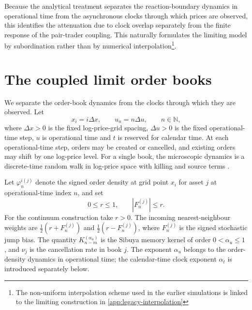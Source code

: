 \documentclass[5p,final]{elsarticle}
\begin{document}
Because the analytical treatment separates the reaction-boundary dynamics in operational time from the asynchronous clocks through which prices are observed, this identifies the attenuation due to clock overlap separately from the finite response of the pair-trader coupling. This naturally formulates the limiting model by subordination rather than by numerical interpolation\footnote{The non-uniform interpolation scheme used in the earlier simulations \citep{BauerDianaGebbie2024} is linked to the limiting construction in \ref{app:legacy-interpolation}}.

\section{The coupled limit order books} \label{sec:2}

We separate the order-book dynamics from the clocks through which they are observed. Let
\begin{equation}
    x_i=i\Delta x,
    \qquad
    u_n=n\Delta u,
    \qquad n\in\mathbb N,
\end{equation}
where $\Delta x>0$ is the fixed log-price-grid spacing, $\Delta u>0$ is the fixed operational-time step, $u$ is operational time and $t$ is reserved for calendar time. At each operational-time step, orders may be created or cancelled, and existing orders may shift by one log-price level. For a single book, the microscopic dynamics is a discrete-time random walk in log-price space with killing and source terms \citep{angstmann2016,angstmann2019advection,DianaGebbie2025}.

Let $\varphi_n^{i(j)}$ denote the signed order density at grid point $x_i$ for asset $j$ at operational-time index $n$, and set
\begin{equation}
    0\leq r\leq1,
    \qquad
    |F_n^{(j)}|\leq r.
\end{equation}
For the continuum construction take $r>0$. The incoming nearest-neighbour weights are $\tfrac12(r+F_n^{(j)})$ and $\tfrac12(r-F_n^{(j)})$, where $F_n^{(j)}$ is the signed stochastic jump bias. The quantity $K_{n-m}^{(\alpha_u)}$ is the Sibuya memory kernel of order $0<\alpha_u\leq1$ \cite{angstmann2016}, and $\nu_j$ is the cancellation rate in book $j$. The exponent $\alpha_u$ belongs to the order-density dynamics in operational time; the calendar-time clock exponent $\alpha_t$ is introduced separately below.
\end{document}
